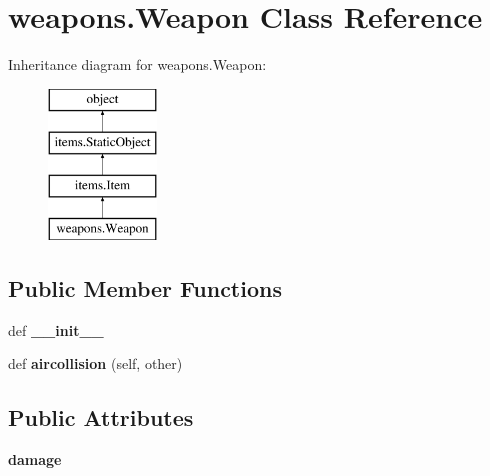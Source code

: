 \hypertarget{classweapons_1_1_weapon}{}\section{weapons.\+Weapon Class Reference}
\label{classweapons_1_1_weapon}
Inheritance diagram for weapons.\+Weapon\+:\begin{figure}[H]
\begin{center}
\leavevmode
\includegraphics[height=4.000000cm]{classweapons_1_1_weapon}
\end{center}
\end{figure}
\subsection*{Public Member Functions}
\begin{DoxyCompactItemize}
\item 
\hypertarget{classweapons_1_1_weapon_ae81ed20c84d8c22b540f49d819d3789a}{}def {\bfseries \+\_\+\+\_\+init\+\_\+\+\_\+}\label{classweapons_1_1_weapon_ae81ed20c84d8c22b540f49d819d3789a}

\item 
\hypertarget{classweapons_1_1_weapon_ab4a7cb8ab6274b0a430aaa3718551c67}{}def {\bfseries aircollision} (self, other)\label{classweapons_1_1_weapon_ab4a7cb8ab6274b0a430aaa3718551c67}

\end{DoxyCompactItemize}
\subsection*{Public Attributes}
\begin{DoxyCompactItemize}
\item 
\hypertarget{classweapons_1_1_weapon_ac68eb3b6697d2b5d9a1096fb3a7d9e13}{}{\bfseries damage}\label{classweapons_1_1_weapon_ac68eb3b6697d2b5d9a1096fb3a7d9e13}

\end{DoxyCompactItemize}
